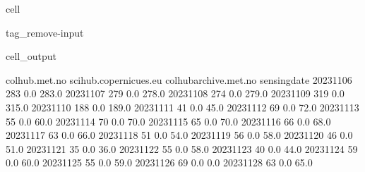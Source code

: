 \documentclass[letterpaper,10pt,english]{jupyterBook}
\begin{document}
\begin{sphinxuseclass}{cell}
\begin{sphinxuseclass}{tag_remove-input}\begin{sphinxVerbatimOutput}

\begin{sphinxuseclass}{cell_output}
\begin{sphinxVerbatim}[commandchars=\\\{\}]
              colhub.met.no  scihub.copernicues.eu  colhub\PYGZhy{}archive.met.no  \PYGZbs{}
sensing\PYGZus{}date                                                                
2023\PYGZhy{}11\PYGZhy{}06              283                    0.0                  283.0   
2023\PYGZhy{}11\PYGZhy{}07              279                    0.0                  278.0   
2023\PYGZhy{}11\PYGZhy{}08              274                    0.0                  279.0   
2023\PYGZhy{}11\PYGZhy{}09              319                    0.0                  315.0   
2023\PYGZhy{}11\PYGZhy{}10              188                    0.0                  189.0   
2023\PYGZhy{}11\PYGZhy{}11               41                    0.0                   45.0   
2023\PYGZhy{}11\PYGZhy{}12               69                    0.0                   72.0   
2023\PYGZhy{}11\PYGZhy{}13               55                    0.0                   60.0   
2023\PYGZhy{}11\PYGZhy{}14               70                    0.0                   70.0   
2023\PYGZhy{}11\PYGZhy{}15               65                    0.0                   70.0   
2023\PYGZhy{}11\PYGZhy{}16               66                    0.0                   68.0   
2023\PYGZhy{}11\PYGZhy{}17               63                    0.0                   66.0   
2023\PYGZhy{}11\PYGZhy{}18               51                    0.0                   54.0   
2023\PYGZhy{}11\PYGZhy{}19               56                    0.0                   58.0   
2023\PYGZhy{}11\PYGZhy{}20               46                    0.0                   51.0   
2023\PYGZhy{}11\PYGZhy{}21               35                    0.0                   36.0   
2023\PYGZhy{}11\PYGZhy{}22               55                    0.0                   58.0   
2023\PYGZhy{}11\PYGZhy{}23               40                    0.0                   44.0   
2023\PYGZhy{}11\PYGZhy{}24               59                    0.0                   60.0   
2023\PYGZhy{}11\PYGZhy{}25               55                    0.0                   59.0   
2023\PYGZhy{}11\PYGZhy{}26               69                    0.0                    0.0   
2023\PYGZhy{}11\PYGZhy{}28               63                    0.0                   65.0   

\end{sphinxVerbatim}
\end{sphinxuseclass}
\end{sphinxVerbatimOutput}
\end{sphinxuseclass}
\end{sphinxuseclass}
\end{document}
